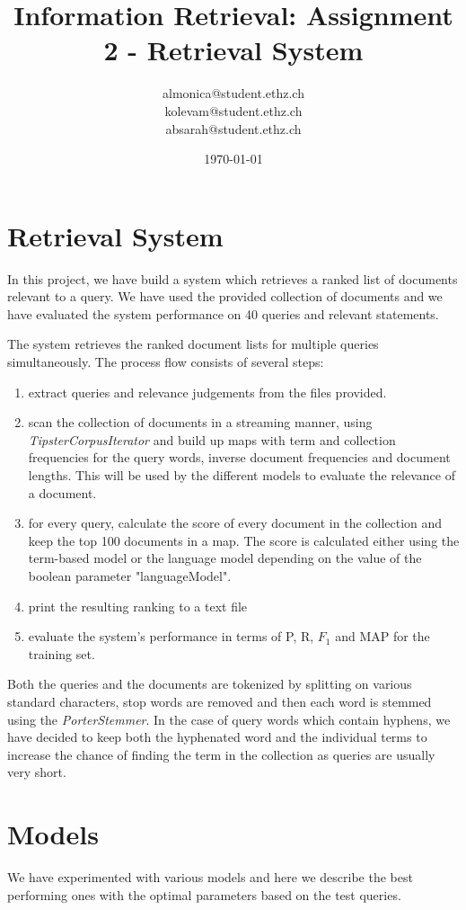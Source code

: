 \documentclass[a4paper, 11pt]{article}
\title{Information Retrieval: Assignment 2 - Retrieval System
}
\author{almonica@student.ethz.ch\\ kolevam@student.ethz.ch\\ absarah@student.ethz.ch\\}
\date{\today}
\begin{document}
\maketitle

\section{Retrieval System} 
In this project, we have build a system which retrieves a ranked list of documents relevant to a query. We have used the provided collection of documents and we have evaluated the system performance on 40 queries and relevant statements. 

The system retrieves the ranked document lists  for multiple queries simultaneously. The process flow consists of several steps:
\begin{enumerate}
\item extract queries and relevance judgements from the files provided.
\item scan the collection of documents in a streaming manner, using \textit{TipsterCorpusIterator} and build up maps with term and collection frequencies for the query words, inverse document frequencies and document lengths. This will be used by the different models to evaluate the relevance of a document.

\item for every query, calculate the score of every document in the collection and keep the top 100 documents in a map. The score is calculated either using the term-based model or the language model depending on the value of the boolean parameter "languageModel".

\item print the resulting ranking to a text file

\item evaluate the system's performance in terms of P, R, $F_1$ and MAP for the training set.
\end{enumerate}

Both the queries and the documents are tokenized by splitting on various standard characters, stop words are removed and then each word is stemmed using the \textit{PorterStemmer}. In the case of query words which contain hyphens, we have decided to keep both the hyphenated word and the individual terms to increase the chance of finding the term in the collection as queries are usually very short.

\section{Models}
We have experimented with various models and here we describe the best performing ones with the optimal parameters based on the test queries.
\end{document}
